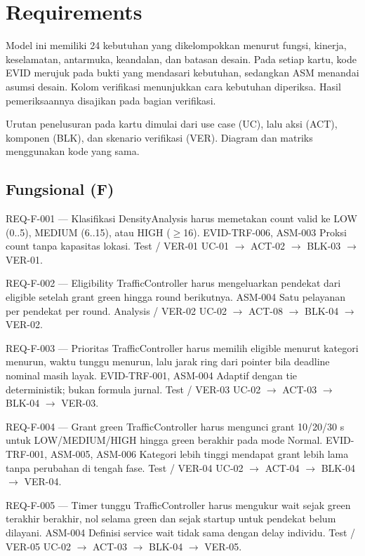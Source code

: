 \clearpage
\section{Requirements}

Model ini memiliki 24 kebutuhan yang dikelompokkan menurut fungsi, kinerja, keselamatan, antarmuka, keandalan, dan batasan desain. Pada setiap kartu, kode EVID merujuk pada bukti yang mendasari kebutuhan, sedangkan ASM menandai asumsi desain. Kolom verifikasi menunjukkan cara kebutuhan diperiksa. Hasil pemeriksaannya disajikan pada bagian verifikasi.

Urutan penelusuran pada kartu dimulai dari use case (UC), lalu aksi (ACT), komponen (BLK), dan skenario verifikasi (VER). Diagram dan matriks menggunakan kode yang sama.

\subsection{Fungsional (F)}

\requirementcard
{REQ-F-001 --- Klasifikasi}
{DensityAnalysis harus memetakan count valid ke LOW (0..5), MEDIUM (6..15), atau HIGH ($\geq$16).}
{EVID-TRF-006, ASM-003}
{Proksi count tanpa kapasitas lokasi.}
{Test / VER-01}
{UC-01 $\rightarrow$ ACT-02 $\rightarrow$ BLK-03 $\rightarrow$ VER-01.}

\requirementcard
{REQ-F-002 --- Eligibility}
{TrafficController harus mengeluarkan pendekat dari eligible setelah grant green hingga round berikutnya.}
{ASM-004}
{Satu pelayanan per pendekat per round.}
{Analysis / VER-02}
{UC-02 $\rightarrow$ ACT-08 $\rightarrow$ BLK-04 $\rightarrow$ VER-02.}

\requirementcard
{REQ-F-003 --- Prioritas}
{TrafficController harus memilih eligible menurut kategori menurun, waktu tunggu menurun, lalu jarak ring dari pointer bila deadline nominal masih layak.}
{EVID-TRF-001, ASM-004}
{Adaptif dengan tie deterministik; bukan formula jurnal.}
{Test / VER-03}
{UC-02 $\rightarrow$ ACT-03 $\rightarrow$ BLK-04 $\rightarrow$ VER-03.}

\requirementcard
{REQ-F-004 --- Grant green}
{TrafficController harus mengunci grant 10/20/30 s untuk LOW/MEDIUM/HIGH hingga green berakhir pada mode Normal.}
{EVID-TRF-001, ASM-005, ASM-006}
{Kategori lebih tinggi mendapat grant lebih lama tanpa perubahan di tengah fase.}
{Test / VER-04}
{UC-02 $\rightarrow$ ACT-04 $\rightarrow$ BLK-04 $\rightarrow$ VER-04.}

\requirementcard
{REQ-F-005 --- Timer tunggu}
{TrafficController harus mengukur wait sejak green terakhir berakhir, nol selama green dan sejak startup untuk pendekat belum dilayani.}
{ASM-004}
{Definisi service wait tidak sama dengan delay individu.}
{Test / VER-05}
{UC-02 $\rightarrow$ ACT-03 $\rightarrow$ BLK-04 $\rightarrow$ VER-05.}

